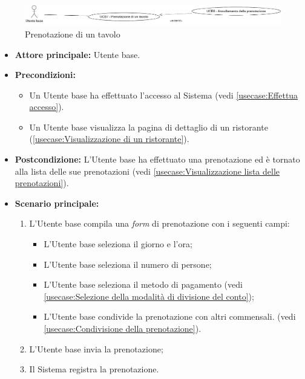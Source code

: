 \label{usecase:Prenotazione di un tavolo}

\begin{figure}[h]
	\centering
	\includegraphics[width=0.999\textwidth]{./uml/UCB7-UCB8.png} 
	\caption{Prenotazione di un tavolo}
	\label{fig:UCB8-10}
  \end{figure}

\begin{itemize}
	\item \textbf{Attore principale:} Utente base.
	\item \textbf{Precondizioni:}
	      \begin{itemize}
		      \item Un Utente base ha effettuato l'accesso al Sistema (vedi \autoref{usecase:Effettua accesso}).
		      \item Un Utente base visualizza la pagina di dettaglio di un ristorante (\autoref{usecase:Visualizzazione di un ristorante}).
	      \end{itemize}
	\item \textbf{Postcondizione:} L'Utente base ha effettuato una prenotazione ed è tornato alla lista delle sue prenotazioni (vedi \autoref{usecase:Visualizzazione lista delle prenotazioni}).


	\item \textbf{Scenario principale:}
	      \begin{enumerate}
		      \item L'Utente base compila una \textit{form} di prenotazione con i seguenti campi:
			 \begin{itemize}
				\item L'Utente base seleziona il giorno e l'ora;
		      	\item L'Utente base seleziona il numero di persone;
		      	\item L'Utente base seleziona il metodo di pagamento (vedi \autoref{usecase:Selezione della modalità di divisione del conto});
		      	\item L'Utente base condivide la prenotazione con altri commensali. (vedi \autoref{usecase:Condivisione della prenotazione}).
			 \end{itemize}
		      \item L'Utente base invia la prenotazione;
		      \item Il Sistema registra la prenotazione.


\end{enumerate}
\end{itemize}
